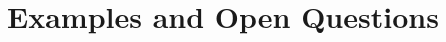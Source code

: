 \documentclass[aspectratio=169,xcolor=dvipsnames,11pt]{beamer}
\begin{document}
\section{Examples and Open Questions}
\end{document}
